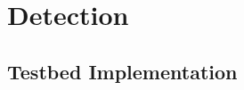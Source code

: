 % 
\chapter{Detection}
\label{ch:detection}

\section{Testbed Implementation }
\label{sec:ch5_testbed}


